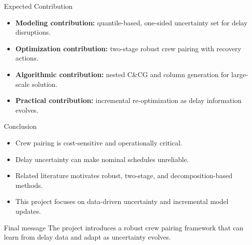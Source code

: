 \documentclass[aspectratio=169]{beamer}
\begin{document}
\begin{frame}{Expected Contribution}
  \begin{itemize}
    \item \textbf{Modeling contribution:}
      quantile-based, one-sided uncertainty set for delay disruptions.
    \item \textbf{Optimization contribution:}
      two-stage robust crew pairing with recovery actions.
    \item \textbf{Algorithmic contribution:}
      nested C\&CG and column generation for large-scale solution.
    \item \textbf{Practical contribution:}
      incremental re-optimization as delay information evolves.
  \end{itemize}
\end{frame}

\begin{frame}{Conclusion}
  \begin{itemize}
    \item Crew pairing is cost-sensitive and operationally critical.
    \item Delay uncertainty can make nominal schedules unreliable.
    \item Related literature motivates robust, two-stage, and decomposition-based methods.
    \item This project focuses on data-driven uncertainty and incremental model updates.
  \end{itemize}

  \vspace{0.3cm}
  \begin{block}{Final message}
    The project introduces a robust crew pairing framework that can learn from delay data and adapt as uncertainty evolves.
  \end{block}
\end{frame}
\end{document}

